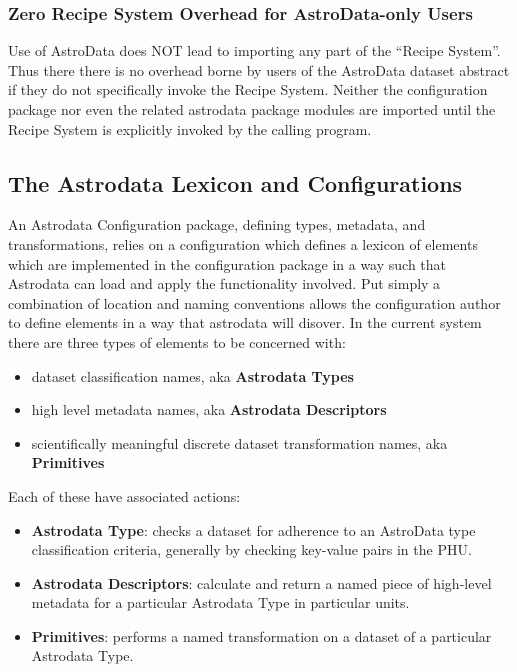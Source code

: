 \documentclass[letterpaper,10pt,english]{sphinxmanual}
\begin{document}
\subsubsection{Zero Recipe System Overhead for AstroData-only Users}
\label{gen.ADMANUAL_ADConcepts:zero-recipe-system-overhead-for-astrodata-only-users}
Use of AstroData does NOT lead to importing any part of the ``Recipe
System''. Thus there there is no overhead borne by users of the
AstroData dataset abstract if they do not specifically invoke the
Recipe System. Neither the configuration package nor even the related
astrodata package modules are imported until the Recipe System is
explicitly invoked by the calling program.


\subsection{The Astrodata Lexicon and Configurations}
\label{gen.ADMANUAL_ADConcepts:the-astrodata-lexicon-and-configurations}
An Astrodata Configuration package, defining types, metadata, and
transformations, relies on a configuration which defines a lexicon of
elements which are implemented in the configuration package in a way
such that Astrodata can load and apply the functionality involved. Put
simply a combination of location and naming conventions allows the
configuration author to define elements in a way that astrodata will
disover. In the current system there are three types of elements to be
concerned with:
\begin{itemize}
\item {} 
dataset classification names, aka \textbf{Astrodata Types}

\item {} 
high level metadata names, aka \textbf{Astrodata Descriptors}

\item {} 
scientifically meaningful discrete dataset transformation names, aka
\textbf{Primitives}

\end{itemize}

Each of these have associated actions:
\begin{itemize}
\item {} 
\textbf{Astrodata Type}: checks a dataset for adherence to an AstroData
type classification criteria, generally by checking key-value pairs in
the PHU.

\item {} 
\textbf{Astrodata Descriptors}: calculate and return a named piece of
high-level metadata for a particular Astrodata Type in particular
units.

\item {} 
\textbf{Primitives}: performs a named transformation on a dataset of a
particular Astrodata Type.

\end{itemize}
\end{document}
